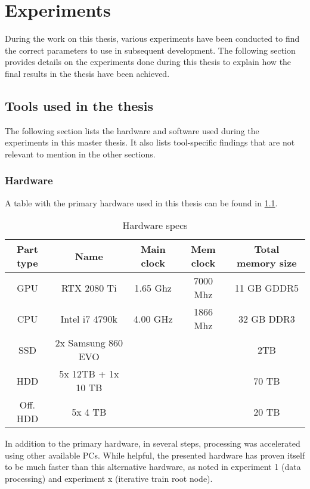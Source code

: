 \chapter{Experiments}

During the work on this thesis, various experiments have been conducted to find the correct parameters to use in subsequent development.
The following section provides details on the experiments done during this thesis to explain how the final results in the thesis have been achieved.



\section{Tools used in the thesis}
The following section lists the hardware and software used during the experiments in this master thesis.
It also lists tool-specific findings that are not relevant to mention in the other sections.

\subsection{Hardware}
\label{chex:hardware}

A table with the primary hardware used in this thesis can be found in \cref{tab:hardware}.

\begin{table}[ht]
    \centering
    \begin{tabular}{|c|c|c|c|c|}
        \hline
        Part type & Name & Main clock & Mem clock & Total memory size\\ \hline
        GPU & RTX 2080 Ti & 1.65 Ghz & 7000 Mhz & 11 GB GDDR5\\ \hline
        CPU & Intel i7 4790k & 4.00 GHz & 1866 Mhz & 32 GB DDR3\\ \hline
        SSD & 2x Samsung 860 EVO & & & 2TB \\ \hline
        HDD & 5x 12TB + 1x 10 TB & & & 70 TB \\ \hline
        Off. HDD & 5x 4 TB & & & 20 TB \\ \hline
        
    \end{tabular}
    \caption{Hardware specs}
    \label{tab:hardware}
\end{table}

In addition to the primary hardware, in several steps, processing was accelerated using other available PCs.
While helpful, the presented hardware has proven itself to be much faster than this alternative hardware, as noted in experiment 1 (data processing) and experiment x (iterative train root node). %

